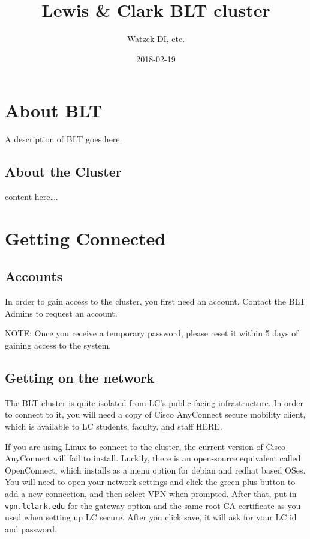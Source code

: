 \documentclass[]{book}
\title{Lewis \& Clark BLT cluster}
\author{Watzek DI, etc.}
\date{2018-02-19}
\begin{document}
\maketitle

{
\setcounter{tocdepth}{1}
\tableofcontents
}
\chapter*{About BLT}\label{about-blt}

A description of BLT goes here.

\section{About the Cluster}\label{about-the-cluster}

content here\ldots{}.

\chapter{Getting Connected}\label{getting-connected}

\section{Accounts}\label{accounts}

In order to gain access to the cluster, you first need an account.
Contact the BLT Admins to request an account.

NOTE: Once you receive a temporary password, please reset it within 5
days of gaining access to the system.

\section{Getting on the network}\label{getting-on-the-network}

The BLT cluster is quite isolated from LC's public-facing
infrastructure. In order to connect to it, you will need a copy of Cisco
AnyConnect secure mobility client, which is available to LC students,
faculty, and staff HERE.

If you are using Linux to connect to the cluster, the current version of
Cisco AnyConnect will fail to install. Luckily, there is an open-source
equivalent called OpenConnect, which installs as a menu option for
debian and redhat based OSes. You will need to open your network
settings and click the green plus button to add a new connection, and
then select VPN when prompted. After that, put in
\texttt{vpn.lclark.edu} for the gateway option and the same root CA
certificate as you used when setting up LC secure. After you click save,
it will ask for your LC id and password.
\end{document}
